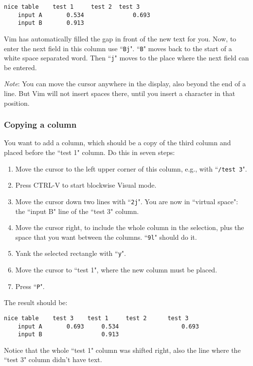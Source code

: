 \begin{Verbatim}[samepage=true]
    nice table    test 1     test 2  test 3
    input A       0.534              0.693
    input B       0.913
\end{Verbatim}

Vim has automatically filled the gap in front of the new text for you.
Now, to enter the next field in this column use ``\texttt{Bj}".
``\texttt{B}" moves back to the start of a white space separated word.
Then ``\texttt{j}" moves to the place where the next field can be entered.

\emph{Note}: You can move the cursor anywhere in the display, also beyond the end of a line.
But Vim will not insert spaces there, until you insert a character in that position.

\subsubsection{Copying a column}
You want to add a column, which should be a copy of the third column and placed before the ``test 1" column.
Do this in seven steps:

\begin{enumerate}
\item Move the cursor to the left upper corner of this column, e.g., with ``\texttt{/test 3}".
\item Press CTRL-V to start blockwise Visual mode.
\item Move the cursor down two lines with ``\texttt{2j}".  You are now in ``virtual space": the ``input B" line of the ``test 3" column.
\item Move the cursor right, to include the whole column in the selection, plus the space that you want between the columns.  ``\texttt{9l}" should do it.
\item Yank the selected rectangle with ``\texttt{y}".
\item Move the cursor to ``test 1", where the new column must be placed.
\item Press ``\texttt{P}".
\end{enumerate}

The result should be:

\begin{Verbatim}[samepage=true]
    nice table    test 3    test 1     test 2      test 3
    input A       0.693     0.534                  0.693
    input B                 0.913
\end{Verbatim}

Notice that the whole ``test 1" column was shifted right, also the line where the ``test 3" column didn't have text.

